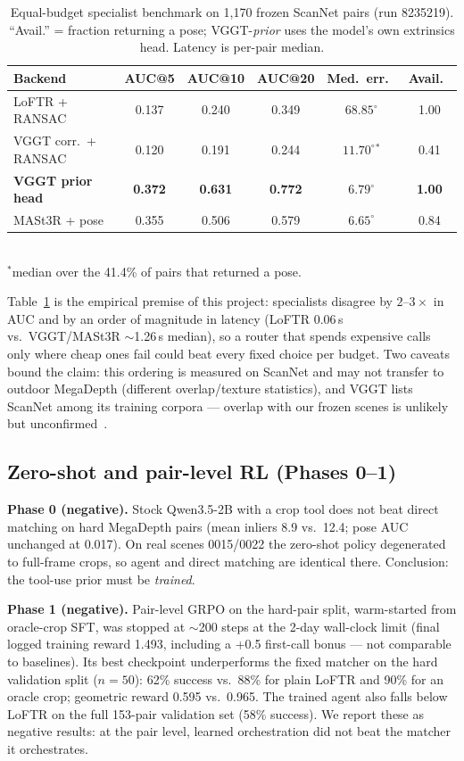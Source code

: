 \documentclass[10pt,twocolumn,letterpaper]{article}
\begin{document}
\begin{table}[t]
\centering\small
\caption{Equal-budget specialist benchmark on 1,170 frozen ScanNet pairs
(run 8235219). ``Avail.'' = fraction returning a pose; VGGT-\emph{prior}
uses the model's own extrinsics head. Latency is per-pair median.}
\label{tab:specialists}
\begin{tabular}{lccccc}
\toprule
Backend & AUC@5 & AUC@10 & AUC@20 & Med.\ err.\ & Avail.\ \\
\midrule
LoFTR + RANSAC & 0.137 & 0.240 & 0.349 & $68.85^\circ$ & 1.00 \\
VGGT corr.\ + RANSAC & 0.120 & 0.191 & 0.244 & $11.70^\circ$\!$^*$ & 0.41 \\
\textbf{VGGT prior head} & \textbf{0.372} & \textbf{0.631} & \textbf{0.772} & $\mathbf{6.79^\circ}$ & \textbf{1.00} \\
MASt3R + pose & 0.355 & 0.506 & 0.579 & $6.65^\circ$ & 0.84 \\
\bottomrule
\end{tabular}
\\[2pt]{\footnotesize $^*$median over the 41.4\% of pairs that returned a pose.}
\end{table}

Table~\ref{tab:specialists} is the empirical premise of this project:
specialists disagree by $2$--$3\times$ in AUC and by an order of magnitude
in latency (LoFTR 0.06\,s vs.\ VGGT/MASt3R $\sim$1.26\,s median), so a
router that spends expensive calls only where cheap ones fail could beat
every fixed choice per budget. Two caveats bound the claim: this ordering
is measured on ScanNet and may not transfer to outdoor MegaDepth
(different overlap/texture statistics), and VGGT lists ScanNet among its
training corpora — overlap with our frozen scenes is unlikely but
unconfirmed~\cite{vggt}.

\subsection{Zero-shot and pair-level RL (Phases 0--1)}

\textbf{Phase 0 (negative).} Stock Qwen3.5-2B with a crop tool does not
beat direct matching on hard MegaDepth pairs (mean inliers 8.9 vs.\ 12.4;
pose AUC unchanged at 0.017). On real scenes 0015/0022 the zero-shot
policy degenerated to full-frame crops, so agent and direct matching are
identical there. Conclusion: the tool-use prior must be \emph{trained}.

\textbf{Phase 1 (negative).} Pair-level GRPO on the hard-pair split,
warm-started from oracle-crop SFT, was stopped at $\sim$200 steps at the
2-day wall-clock limit (final logged training reward 1.493, including a
+0.5 first-call bonus — not comparable to baselines). Its best checkpoint
underperforms the fixed matcher on the hard validation split ($n{=}50$):
62\% success vs.\ 88\% for plain LoFTR and 90\% for an oracle crop;
geometric reward 0.595 vs.\ 0.965. The trained agent also falls below
LoFTR on the full 153-pair validation set (58\% success). We report these
as negative results: at the pair level, learned orchestration did not beat
the matcher it orchestrates.
\end{document}
